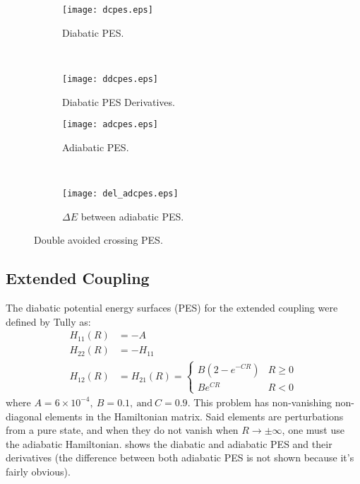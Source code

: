 \begin{figure}
\centering
\begin{subfigure}[t]{0.485\textwidth}
\centering
\texttt{[image: dcpes.eps]}
\caption[]{Diabatic PES.}
\label{sumf:pesdc}
\end{subfigure}
~
\begin{subfigure}[t]{0.485\textwidth}
\centering
\texttt{[image: ddcpes.eps]}
\caption[]{Diabatic PES Derivatives.}
\label{sumf:dpesdc}
\end{subfigure}

\begin{subfigure}[t]{0.485\textwidth}
\centering
\texttt{[image: adcpes.eps]}
\caption[]{Adiabatic PES.}
\label{sumf:apesdc}
\end{subfigure}
~
\begin{subfigure}[t]{0.485\textwidth}
\centering
\texttt{[image: del\_adcpes.eps]}
\caption[]{$ \Delta E$ between adiabatic PES.}
\label{sumf:delapesdc}
\end{subfigure}
\caption[]{Double avoided crossing PES.}\label{sumf:dcpes}
\end{figure}
%
\subsection*{Extended Coupling}
%
The diabatic potential energy surfaces (PES) for the extended coupling 
were defined by Tully \cite{tully} as:
\begin{subequations}
\begin{align}
H_{11}(R) & = -A\\
H_{22}(R) & = -H_{11}\\
H_{12}(R) & = H_{21}(R) = 
\begin{cases}
B(2 - e^{-C R}) & R\geq 0 \\
B e^{C R} & R<0
\end{cases}
\end{align}
\end{subequations}
where $ A = 6 \times 10^{-4},~B = 0.1,~\text{and}~C = 0.9$. This problem has non-vanishing non-diagonal elements in the Hamiltonian matrix. Said elements are perturbations from a pure state, and when they do not vanish when $ R \rightarrow \pm\infty $, one must use the adiabatic Hamiltonian.  shows the diabatic and adiabatic PES and their derivatives (the difference between both adiabatic PES is not shown because it's fairly obvious).

